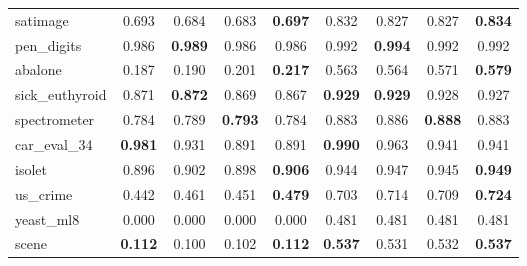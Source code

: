 \begin{figure}[ht]
\begin{tabular}{p{22mm}|*4{p{14mm}}|*4{p{14mm}}}
        satimage&\multicolumn{1}{c}{0.693}&\multicolumn{1}{c}{0.684}&\multicolumn{1}{c}{0.683}&\multicolumn{1}{c|}{\textbf{0.697}}&\multicolumn{1}{c}{0.832}&\multicolumn{1}{c}{0.827}&\multicolumn{1}{c}{0.827}&\multicolumn{1}{c}{\textbf{0.834}}\\
        pen\_digits&\multicolumn{1}{c}{0.986}&\multicolumn{1}{c}{\textbf{0.989}}&\multicolumn{1}{c}{0.986}&\multicolumn{1}{c|}{0.986}&\multicolumn{1}{c}{0.992}&\multicolumn{1}{c}{\textbf{0.994}}&\multicolumn{1}{c}{0.992}&\multicolumn{1}{c}{0.992}\\
        abalone&\multicolumn{1}{c}{0.187}&\multicolumn{1}{c}{0.190}&\multicolumn{1}{c}{0.201}&\multicolumn{1}{c|}{\textbf{0.217}}&\multicolumn{1}{c}{0.563}&\multicolumn{1}{c}{0.564}&\multicolumn{1}{c}{0.571}&\multicolumn{1}{c}{\textbf{0.579}}\\
        sick\_euthyroid&\multicolumn{1}{c}{0.871}&\multicolumn{1}{c}{\textbf{0.872}}&\multicolumn{1}{c}{0.869}&\multicolumn{1}{c|}{0.867}&\multicolumn{1}{c}{\textbf{0.929}}&\multicolumn{1}{c}{\textbf{0.929}}&\multicolumn{1}{c}{0.928}&\multicolumn{1}{c}{0.927}\\
        spectrometer&\multicolumn{1}{c}{0.784}&\multicolumn{1}{c}{0.789}&\multicolumn{1}{c}{\textbf{0.793}}&\multicolumn{1}{c|}{0.784}&\multicolumn{1}{c}{0.883}&\multicolumn{1}{c}{0.886}&\multicolumn{1}{c}{\textbf{0.888}}&\multicolumn{1}{c}{0.883}\\
        car\_eval\_34&\multicolumn{1}{c}{\textbf{0.981}}&\multicolumn{1}{c}{0.931}&\multicolumn{1}{c}{0.891}&\multicolumn{1}{c|}{0.891}&\multicolumn{1}{c}{\textbf{0.990}}&\multicolumn{1}{c}{0.963}&\multicolumn{1}{c}{0.941}&\multicolumn{1}{c}{0.941}\\
        isolet&\multicolumn{1}{c}{0.896}&\multicolumn{1}{c}{0.902}&\multicolumn{1}{c}{0.898}&\multicolumn{1}{c|}{\textbf{0.906}}&\multicolumn{1}{c}{0.944}&\multicolumn{1}{c}{0.947}&\multicolumn{1}{c}{0.945}&\multicolumn{1}{c}{\textbf{0.949}}\\
        us\_crime&\multicolumn{1}{c}{0.442}&\multicolumn{1}{c}{0.461}&\multicolumn{1}{c}{0.451}&\multicolumn{1}{c|}{\textbf{0.479}}&\multicolumn{1}{c}{0.703}&\multicolumn{1}{c}{0.714}&\multicolumn{1}{c}{0.709}&\multicolumn{1}{c}{\textbf{0.724}}\\
        yeast\_ml8&\multicolumn{1}{c}{0.000}&\multicolumn{1}{c}{0.000}&\multicolumn{1}{c}{0.000}&\multicolumn{1}{c|}{0.000}&\multicolumn{1}{c}{0.481}&\multicolumn{1}{c}{0.481}&\multicolumn{1}{c}{0.481}&\multicolumn{1}{c}{0.481}\\
        scene&\multicolumn{1}{c}{\textbf{0.112}}&\multicolumn{1}{c}{0.100}&\multicolumn{1}{c}{0.102}&\multicolumn{1}{c|}{\textbf{0.112}}&\multicolumn{1}{c}{\textbf{0.537}}&\multicolumn{1}{c}{0.531}&\multicolumn{1}{c}{0.532}&\multicolumn{1}{c}{\textbf{0.537}}\\

\end{tabular}
\end{figure}
